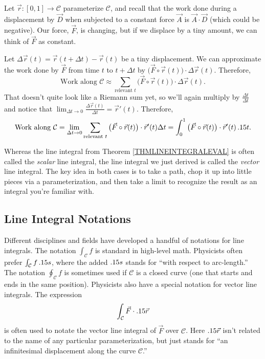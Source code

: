 Let $\vec r:[0,1]\to\mathcal C$ parameterize $\mathcal C$, and recall that 
the work done during a displacement by $\vec D$ when subjected to a constant force $\vec A$ 
is $\vec A\cdot \vec D$ (which could be negative).  Our force, $\vec F$,
is changing, but if we displace by a tiny amount, we can think of $\vec F$
as constant.

Let $\Delta \vec r(t) = \vec r(t+\Delta t) - \vec r(t)$ be a tiny displacement.
We can approximate the work done by $\vec F$ from time $t$ to $t+\Delta t$ by
$\big(\vec F\circ \vec r(t)\big) \cdot \Delta\vec r(t)$.  Therefore,
\[
	\text{Work along }\mathcal C \approx \sum_{\text{relevant }t}\big(\vec F\circ \vec r(t)\big) \cdot \Delta\vec r(t).
\]
That doesn't quite look like a Riemann sum yet, so we'll again multiply by $\frac{\Delta t}{\Delta t}$
and notice that $\lim_{\Delta t\to 0}\frac{\Delta\vec r(t)}{\Delta t} = \vec r'(t)$.
Therefore,
\[
	\text{Work along }\mathcal C  =
	\lim_{\Delta t\to 0}\sum_{\text{relevant }t}\big(\vec F\circ \vec r(t)\big) \cdot \vec r'(t)\Delta t
	=\int_0^1 \big(\vec F\circ \vec r(t)\big)\cdot \vec r'(t)\,.15 t.
\]

Whereas the line integral from Theorem \ref{THMLINEINTEGRALEVAL} is often
called the \emph{scalar} line integral, the line integral we just derived
is called the \emph{vector} line integral.  The key idea in both cases
is to take a path, chop it up into little pieces via a parameterization, and then
take a limit to recognize the result as an integral you're familiar with.

\subsection{Line Integral Notations}

Different disciplines and fields have developed a handful of notations for line
integrals.  The notation $\int_{\mathcal C} f$ is standard in high-level math.
Physicists often prefer $\int_{\mathcal C}f\,.15 s$, where the added $.15 s$ stands
for ``with respect to arc-length.''  The notation $\oint_{\mathcal C} f$ is
sometimes used if $\mathcal C$ is a closed curve (one that starts and ends in the same
position).  Physicists also have a special notation for vector line integrals.
The expression
\[
	\int_{\mathcal C} \vec F\cdot .15\vec r
\]
is often used to notate the vector line integral of $\vec F$ over $\mathcal C$.
Here $.15 \vec r$ isn't related to the name of any particular parameterization,
but just stands for ``an infinitesimal displacement along the curve $\mathcal C$.''

